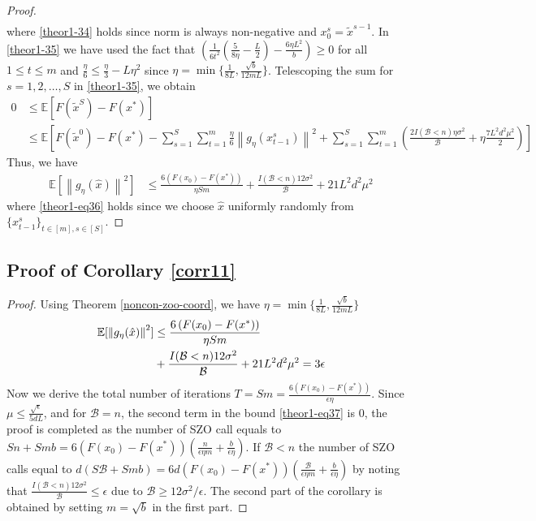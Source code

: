 \documentclass[iicol,sn-basic]{sn-jnl}
\theoremstyle{thmstyleone}%
\theoremstyle{thmstyletwo}%
\theoremstyle{thmstylethree}%
\newcommand*{\E}{\mathbb{E}}
\newcommand{\norm}[1]{\left\lVert#1\right\rVert}
\begin{document}
\begin{proof}
\begin{align}
 \end{align}
 where \eqref{theor1-34} holds since norm is always non-negative and $x_0^s = \tilde{x}^{s-1}$. In \eqref{theor1-35} we have used the fact that $(\frac{1}{6t^2}(\frac{5}{8\eta} - \frac{L}{2})-\frac{6\eta L^2 }{b})\geq 0$ for all $1\leq t \leq m$ and $\frac{\eta}{6} \leq \frac{\eta}{3}-L\eta^2$ since $\eta = \min\{\frac{1}{8L}, \frac{\sqrt{b}}{12 mL}\}$. 
 Telescoping the sum for $s = 1, 2, \ldots, S$ in \eqref{theor1-35}, we obtain
 \begin{equation*}
\begin{split} 
0 &\leq \E[F(\tilde{x}^S) - F({x}^*)] \\
&\leq \E\left[F(\tilde{x}^{0}) - F({x}^*) - \sum_{s=1}^S\sum_{t=1}^m\frac{\eta}{6}\norm{g_{\eta}(x_{t-1}^s)}^2 + \sum_{s=1}^S\sum_{t=1}^m(\frac{2I(\mathcal{B} < n)\eta \sigma ^2}{\mathcal{B}}+\eta \frac{7 L^2 d^2 \mu^2}{2})\right]
 \end{split}
 \end{equation*}
 Thus, we have
  \begin{align}
\E[\norm{g_{\eta}(\hat{x})}^2] & \leq \frac{6\left(F(x_0) - F({x}^*)\right)}{\eta Sm} + \frac{I(\mathcal{B} < n)12\sigma ^2}{\mathcal{B}}+21{L^2 d^2 \mu^2}\label{theor1-eq36}
 \end{align}
 where \eqref{theor1-eq36} holds since we choose  $\hat{x}$ uniformly randomly from $\{x_{t-1}^s\}_{t\in [m], s\in [S]}$. 
\end{proof} 
\noindent\subsection{Proof of Corollary \ref{corr11}}
\begin{proof}
Using Theorem \ref{noncon-zoo-coord}, we have $\eta = \min\{\frac{1}{8L}, \frac{\sqrt{b}}{12mL}\}$
\begin{align}
\E[\norm{g_{\eta}(\hat{x})}^2] & \leq \frac{6\left(F(x_0) - F({x}^*)\right)}{\eta Sm}\notag\\
& + \frac{I(\mathcal{B} < n)12 \sigma ^2}{\mathcal{B}}+21{L^2 d^2 \mu^2} = 3\epsilon\label{theor1-eq37}
 \end{align} 
 Now we derive the total number of iterations   $T = Sm = \frac{6\left(F(x_0) - F({x}^*)\right)}{\epsilon\eta}$. Since $\mu \leq \frac{\sqrt{\epsilon}}{5{dL}}$, and for $\mathcal{B} = n$, the second term in the bound \eqref{theor1-eq37} is $0$, the proof is completed as the number of SZO call equals to $Sn+Smb = 6 \left(F(x_0) - F({x}^*)\right) (\frac{n}{\epsilon\eta m}+\frac{b}{\epsilon\eta})$. If  $\mathcal{B} < n$ the number of SZO calls equal to  $d(S\mathcal{B}+Smb) = 6d \left(F(x_0) - F({x}^*)\right) (\frac{\mathcal{\mathcal{B}}}{\epsilon\eta m}+\frac{b}{\epsilon\eta})$ by noting that $\frac{I(\mathcal{B} < n)12\sigma^2}{\mathcal{B}} \leq \epsilon$ due to $\mathcal{B} \geq 12\sigma^2 /\epsilon$. The second part of the corollary is obtained by setting $m = \sqrt{b}$ in the first part.
\end{proof}
\end{document}

